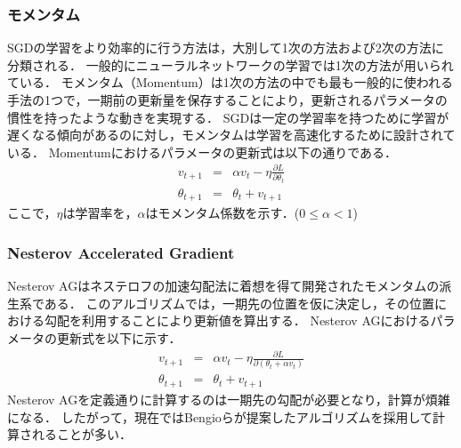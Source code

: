     \subsubsection{モメンタム}
    SGDの学習をより効率的に行う方法は，大別して1次の方法および2次の方法に分類される．
    一般的にニューラルネットワークの学習では1次の方法が用いられている．
    モメンタム\cite{polyak1964some}（Momentum）は1次の方法の中でも最も一般的に使われる手法の1つで，一期前の更新量を保存することにより，更新されるパラメータの慣性を持ったような動きを実現する．
    SGDは一定の学習率を持つために学習が遅くなる傾向があるのに対し，モメンタムは学習を高速化するために設計されている．
    Momentumにおけるパラメータの更新式は以下の通りである．
    \begin{eqnarray}
        v_{t+1} &=& \alpha v_t - \eta \frac{\partial L}{\partial \theta_t}\\
        \theta_{t+1} &=& \theta_t + v_{t+1}
    \end{eqnarray}
    ここで，$\eta$は学習率を，$\alpha$はモメンタム係数を示す．($0\leq\alpha<1$)
    
    \subsubsection{Nesterov Accelerated Gradient}
    Nesterov AG\cite{mikolov2013distributed}はネステロフの加速勾配法\cite{nesterov1983method}に着想を得て開発されたモメンタムの派生系である．
    このアルゴリズムでは，一期先の位置を仮に決定し，その位置における勾配を利用することにより更新値を算出する．
    Nesterov AGにおけるパラメータの更新式を以下に示す．
    \begin{eqnarray}
        v_{t+1} &=& \alpha v_t - \eta \frac{\partial L}{\partial (\theta_t+\alpha v_t)}\\
        \theta_{t+1} &=& \theta_t + v_{t+1}
    \end{eqnarray}
    Nesterov AGを定義通りに計算するのは一期先の勾配が必要となり，計算が煩雑になる．
    したがって，現在ではBengioら\cite{bengio2013advances}が提案したアルゴリズムを採用して計算されることが多い．
    
